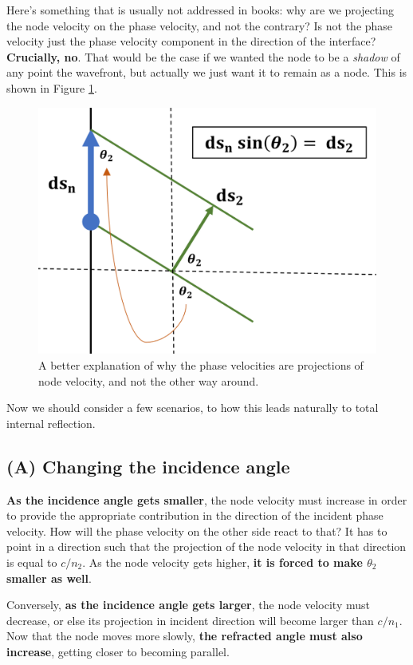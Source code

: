 Here's something that is usually not addressed in books: why are we projecting the node velocity on the phase velocity, and not the contrary? Is not the phase velocity just the phase velocity component in the direction of the interface? \textbf{Crucially, no}. That would be the case if we wanted the node to be a \textit{shadow} of any point the wavefront, but actually we just want it to remain as a node. This is shown in Figure \ref{fig:projection.velocities.TIR}.

\begin{figure}[H]
    \centering
    \includegraphics[width=0.6\linewidth]{Figuras/geometry wave description of TIR.png}
    \caption{A better explanation of why the phase velocities are projections of node velocity, and not the other way around.}
    \label{fig:projection.velocities.TIR}
\end{figure}

Now we should consider a few scenarios, to how this leads naturally to total internal reflection.

\subsection*{(A) Changing the incidence angle}

\textbf{As the incidence angle gets smaller}, the node velocity must increase in order to provide the appropriate contribution in the direction of the incident phase velocity. How will the phase velocity on the other side react to that? It has to point in a direction such that the projection of the node velocity in that direction is equal to $c/n_2$. As the node velocity gets higher, \textbf{it is forced to make $\theta_2$ smaller as well}.

Conversely, \textbf{as the incidence angle gets larger}, the node velocity must decrease, or else its projection in incident direction will become larger than $c/n_1$. Now that the node moves more slowly, \textbf{the refracted angle must also increase}, getting closer to becoming parallel.

